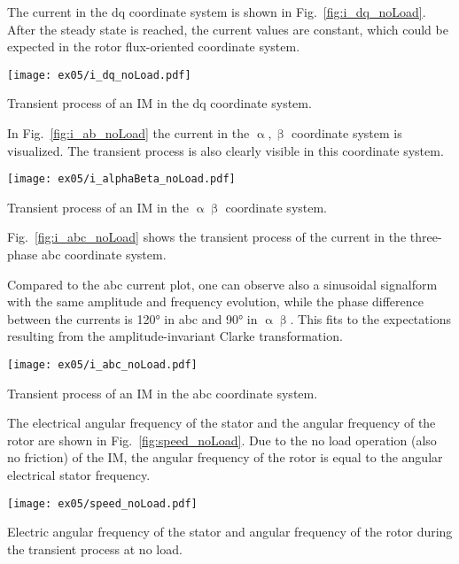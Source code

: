 \begin{solutionblock}
    The current in the dq coordinate system is shown in Fig.~\ref{fig:i_dq_noLoad}. After the steady state is reached, the current values are constant, which could be expected in the rotor flux-oriented coordinate system.
    \begin{solutionfigure}
        \centering
        \texttt{[image: ex05/i\_dq\_noLoad.pdf]}
        \caption{Transient process of an IM in the dq coordinate system.}
        \label{fig:i_dq_noLoad}
    \end{solutionfigure}

    In Fig.~\ref{fig:i_ab_noLoad} the current in the $\upalpha, \upbeta$ coordinate system is visualized. The transient process is also clearly visible in this coordinate system.
    \begin{solutionfigure}
        \centering
        \texttt{[image: ex05/i\_alphaBeta\_noLoad.pdf]}
        \caption{Transient process of an IM in the $\upalpha \upbeta$ coordinate system.}
        \label{fig:i_ab_noLoad}
    \end{solutionfigure}

    Fig.~\ref{fig:i_abc_noLoad} shows the transient process of the current in the three-phase abc coordinate system.
    
    Compared to the abc current plot, one can observe also a sinusoidal signalform with the same amplitude and frequency evolution, while the phase difference between the currents is 120° in abc and 90° in $\upalpha\upbeta$. This fits to the expectations resulting from the amplitude-invariant Clarke transformation.
    \begin{solutionfigure}
        \centering
        \texttt{[image: ex05/i\_abc\_noLoad.pdf]}
        \caption{Transient process of an IM in the abc coordinate system.}
        \label{fig:i_abc_noLoad}
    \end{solutionfigure}

    The electrical angular frequency of the stator and the angular frequency of the rotor are shown in Fig.~\ref{fig:speed_noLoad}. Due to the no load operation (also no friction) of the IM, the angular frequency of the rotor is equal to the angular electrical stator frequency.
    \begin{solutionfigure}
        \centering
        \texttt{[image: ex05/speed\_noLoad.pdf]}
        \caption{Electric angular frequency of the stator and angular frequency of the rotor during the transient process at no load.}
        \label{fig:speed_noLoad}
    \end{solutionfigure}


\end{solutionblock}
